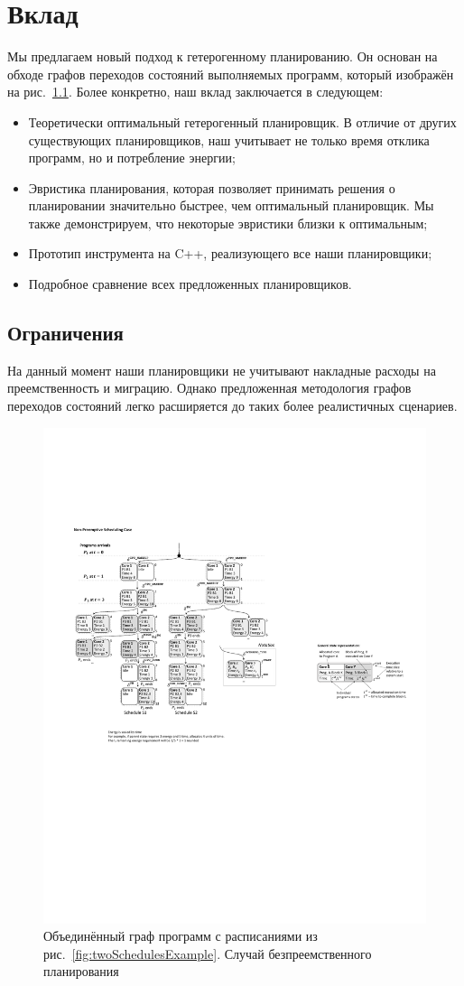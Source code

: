 \chapter{Вклад}
\label{chap:impl}

Мы предлагаем новый подход к гетерогенному планированию. Он основан на обходе графов переходов состояний выполняемых программ, который изображён на рис.~\ref{fig:jSTGExample}. Более конкретно, наш вклад заключается в следующем:
%
\begin{itemize}
\item Теоретически оптимальный гетерогенный планировщик. В отличие от других существующих планировщиков, наш учитывает не только время отклика программ, но и потребление энергии;
\item Эвристика планирования, которая позволяет принимать решения о планировании значительно быстрее, чем оптимальный планировщик. Мы также демонстрируем, что некоторые эвристики близки к оптимальным;
\item Прототип инструмента на C++, реализующего все наши планировщики;
\item Подробное сравнение всех предложенных планировщиков.
\end{itemize}
%

\section{Ограничения}
На данный момент наши планировщики не учитывают накладные расходы на преемственность и миграцию. Однако предложенная методология графов переходов состояний легко расширяется до таких более реалистичных сценариев.

\begin{figure}
\center
\includegraphics[width=.9\textwidth]{figs/jSTG.pdf}
\caption{Объединённый граф программ с расписаниями из рис.~\ref{fig:twoSchedulesExample}. Случай безпреемственного планирования}
\label{fig:jSTGExample}
\end{figure}